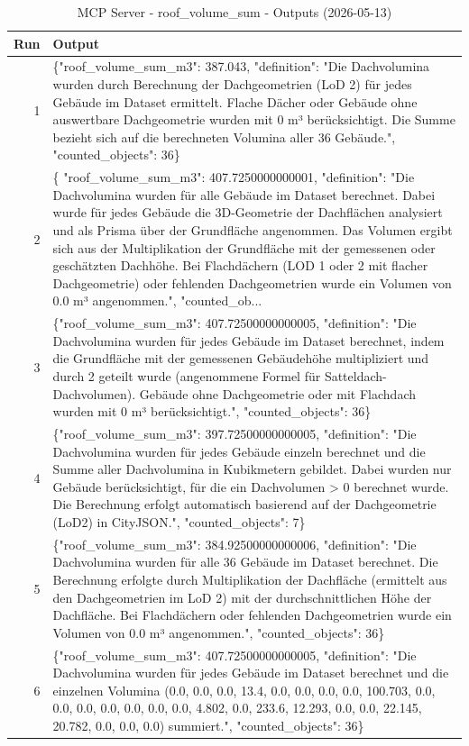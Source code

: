\documentclass[a4paper,11pt]{article}
\begin{document}
\begin{table}[ht]
\centering
\scriptsize
\caption{MCP Server - roof\_volume\_sum - Outputs (2026-05-13)}
\label{tab:mcp\_roof\_volume\_sum\_outputs\_2026-05-13}
\begin{tabular}{r p{12cm}}
\hline
Run & Output \\
\hline
1 & \{"roof\_volume\_sum\_m3": 387.043, "definition": "Die Dachvolumina wurden durch Berechnung der Dachgeometrien (LoD 2) für jedes Gebäude im Dataset ermittelt. Flache Dächer oder Gebäude ohne auswertbare Dachgeometrie wurden mit 0 m³ berücksichtigt. Die Summe bezieht sich auf die berechneten Volumina aller 36 Gebäude.", "counted\_objects": 36\} \\
2 & \{
  "roof\_volume\_sum\_m3": 407.7250000000001,
  "definition": "Die Dachvolumina wurden für alle Gebäude im Dataset berechnet. Dabei wurde für jedes Gebäude die 3D-Geometrie der Dachflächen analysiert und als Prisma über der Grundfläche angenommen. Das Volumen ergibt sich aus der Multiplikation der Grundfläche mit der gemessenen oder geschätzten Dachhöhe. Bei Flachdächern (LOD 1 oder 2 mit flacher Dachgeometrie) oder fehlenden Dachgeometrien wurde ein Volumen von 0.0 m³ angenommen.",
  "counted\_ob... \\
3 & \{"roof\_volume\_sum\_m3": 407.72500000000005, "definition": "Die Dachvolumina wurden für jedes Gebäude im Dataset berechnet, indem die Grundfläche mit der gemessenen Gebäudehöhe multipliziert und durch 2 geteilt wurde (angenommene Formel für Satteldach-Dachvolumen). Gebäude ohne Dachgeometrie oder mit Flachdach wurden mit 0 m³ berücksichtigt.", "counted\_objects": 36\} \\
4 & \{"roof\_volume\_sum\_m3": 397.72500000000005, "definition": "Die Dachvolumina wurden für jedes Gebäude einzeln berechnet und die Summe aller Dachvolumina in Kubikmetern gebildet. Dabei wurden nur Gebäude berücksichtigt, für die ein Dachvolumen > 0 berechnet wurde. Die Berechnung erfolgt automatisch basierend auf der Dachgeometrie (LoD2) in CityJSON.", "counted\_objects": 7\} \\
5 & \{"roof\_volume\_sum\_m3": 384.92500000000006, "definition": "Die Dachvolumina wurden für alle 36 Gebäude im Dataset berechnet. Die Berechnung erfolgte durch Multiplikation der Dachfläche (ermittelt aus den Dachgeometrien im LoD 2) mit der durchschnittlichen Höhe der Dachfläche. Bei Flachdächern oder fehlenden Dachgeometrien wurde ein Volumen von 0.0 m³ angenommen.", "counted\_objects": 36\} \\
6 & \{"roof\_volume\_sum\_m3": 407.72500000000005, "definition": "Die Dachvolumina wurden für jedes Gebäude im Dataset berechnet und die einzelnen Volumina (0.0, 0.0, 0.0, 13.4, 0.0, 0.0, 0.0, 0.0, 100.703, 0.0, 0.0, 0.0, 0.0, 0.0, 0.0, 0.0, 4.802, 0.0, 233.6, 12.293, 0.0, 0.0, 22.145, 20.782, 0.0, 0.0, 0.0) summiert.", "counted\_objects": 36\} \\

\end{tabular}
\end{table}
\end{document}
